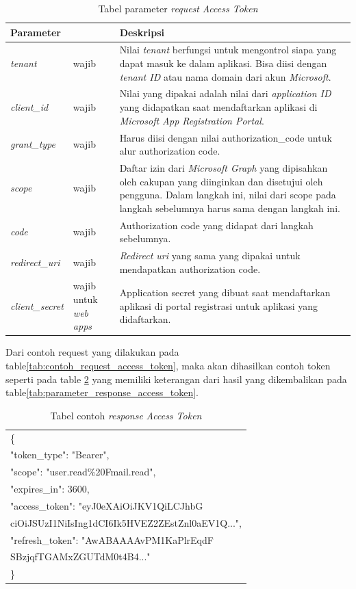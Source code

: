 \begin{table}[H]
	\centering 
	\caption{Tabel parameter \textit{request} \textit{Access Token}}
	\label{tab:parameter_request_access_token}
	\begin{tabular}{|p{3cm}|p{3cm}|p{9cm}|}
	\toprule
	 \textbf{Parameter} & & \textbf{Deskripsi}\\ \hline 
	\textit{tenant} & wajib & Nilai \textit{tenant} berfungsi untuk mengontrol siapa yang dapat masuk ke dalam aplikasi. Bisa diisi dengan \textit{tenant ID} atau nama domain dari akun \textit{Microsoft}.\\ \hline 
	\textit{client\_id} & wajib & Nilai yang dipakai adalah nilai dari \textit{application ID} yang didapatkan saat mendaftarkan aplikasi di \textit{Microsoft App Registration Portal}.\\ \hline 
	\textit{grant\_type} & wajib & Harus diisi dengan nilai authorization\_code untuk alur authorization code. \\ \hline
	\textit{scope} & wajib & Daftar izin dari \textit{Microsoft Graph} yang dipisahkan oleh cakupan yang diinginkan dan disetujui oleh pengguna. Dalam langkah ini, nilai dari scope pada langkah sebelumnya harus sama dengan langkah ini.  \\ \hline 
	\textit{code} & wajib & Authorization code yang didapat dari langkah sebelumnya. \\ \hline  
	\textit{redirect\_uri} & wajib & \textit{Redirect uri} yang sama yang dipakai untuk mendapatkan authorization code. \\ \hline 
	\textit{client\_secret} & wajib untuk \textit{web apps} & Application secret yang dibuat saat mendaftarkan aplikasi di portal registrasi untuk aplikasi yang didaftarkan.\\
	\bottomrule
	\end{tabular}  
\end{table}

Dari contoh request yang dilakukan pada table\ref{tab:contoh_request_access_token}, maka akan dihasilkan contoh token seperti pada table \ref{tab:contoh_response_access_token} yang memiliki keterangan dari hasil yang dikembalikan pada table\ref{tab:parameter_response_access_token}. 

\begin{table}[H]
	\centering 
	\caption{Tabel contoh \textit{response} \textit{Access Token}}
	\label{tab:contoh_response_access_token}
	\begin{tabular}{|p{9cm}|}
	\toprule
	\{\\
    "token\_type": "Bearer",\\
    "scope": "user.read\%20Fmail.read",\\
    "expires\_in": 3600,\\
    "access\_token": "eyJ0eXAiOiJKV1QiLCJhbG\\
    ciOiJSUzI1NiIsIng1dCI6Ik5HVEZ2ZEstZnl0aEV1Q...",\\
    "refresh\_token": "AwABAAAAvPM1KaPlrEqdF\\
    SBzjqfTGAMxZGUTdM0t4B4..."\\
	\}\\ 
	\bottomrule
	\end{tabular}  
\end{table}

